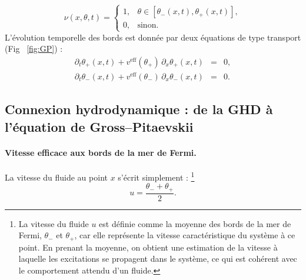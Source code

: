 \begin{equation}\label{eq:merFermi}
    \nu(x,\theta,t) = 
    \begin{cases}
        1, & \theta \in [\theta_-(x,t), \theta_+(x,t)], \\
        0, & \text{sinon}.
    \end{cases}
\end{equation}
L’évolution temporelle des bords est donnée par deux équations de type transport (Fig ~\ref{fig:GP}) \cite{PhysRevLett.119.195301}:  
\begin{eqnarray}
    \partial_t \theta_+(x,t) + v^{\mathrm{eff}}(\theta_+) \, \partial_x \theta_+(x,t) &=& 0, \label{eq:theta+}\\
    \partial_t \theta_-(x,t) + v^{\mathrm{eff}}(\theta_-) \, \partial_x \theta_-(x,t) &=& 0. \label{eq:theta-}
\end{eqnarray}


\subsection{Connexion hydrodynamique : de la GHD à l’équation de Gross--Pitaevskii}

\paragraph{Vitesse efficace aux bords de la mer de Fermi.}  
La vitesse du fluide au point $x$ s'écrit simplement :
\footnote{La vitesse du fluide $u$ est définie comme la moyenne des bords de la mer de Fermi, $\theta_-$ et $\theta_+$, car elle représente la vitesse caractéristique du système à ce point. En prenant la moyenne, on obtient une estimation de la vitesse à laquelle les excitations se propagent dans le système, ce qui est cohérent avec le comportement attendu d'un fluide.}
\begin{equation}
	u = \frac{\theta_- + \theta_+}{2}.
\end{equation}


